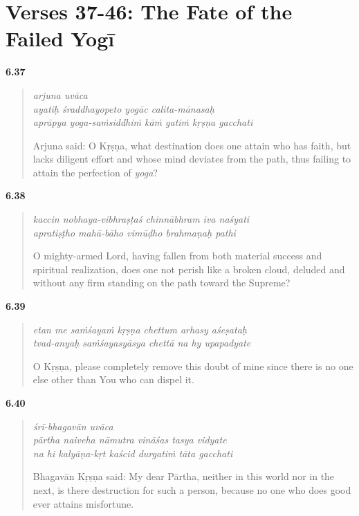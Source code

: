 \section{Verses 37-46: The Fate of the Failed Yogī}\label{sec-verses-37-46-the-fate-of-the-failed-yogi}


\par\noindent\textbf{6.37}\par
\begin{verse}
\textit{arjuna uvāca} \\
\textit{ayatiḥ śraddhayopeto yogāc calita-mānasaḥ} \\
\textit{aprāpya yoga-saṁsiddhiṁ kāṁ gatiṁ kṛṣṇa gacchati}

\noindent Arjuna said: O Kṛṣṇa, what destination does one attain who has faith, but lacks diligent effort and whose mind deviates from the path, thus failing to attain the perfection of \textit{yoga}?
\end{verse}
\par



\par\noindent\textbf{6.38}\par
\begin{verse}
\textit{kaccin nobhaya-vibhraṣṭaś chinnābhram iva naśyati} \\
\textit{apratiṣṭho mahā-bāho vimūḍho brahmaṇaḥ pathi}

\noindent O mighty-armed Lord, having fallen from both material success and spiritual realization, does one not perish like a broken cloud, deluded and without any firm standing on the path toward the Supreme?
\end{verse}
\par



\par\noindent\textbf{6.39}\par
\begin{verse}
\textit{etan me saṁśayaṁ kṛṣṇa chettum arhasy aśeṣataḥ} \\
\textit{tvad-anyaḥ saṁśayasyāsya chettā na hy upapadyate}

\noindent O Kṛṣṇa, please completely remove this doubt of mine since there is no one else other than You who can dispel it.
\end{verse}
\par



\par\noindent\textbf{6.40}\par
\begin{verse}
\textit{śrī-bhagavān uvāca} \\
\textit{pārtha naiveha nāmutra vināśas tasya vidyate} \\
\textit{na hi kalyāṇa-kṛt kaścid durgatiṁ tāta gacchati}

\noindent Bhagavān Kṛṣṇa said: My dear Pārtha, neither in this world nor in the next, is there destruction for such a person, because no one who does good ever attains misfortune.
\end{verse}
\par



